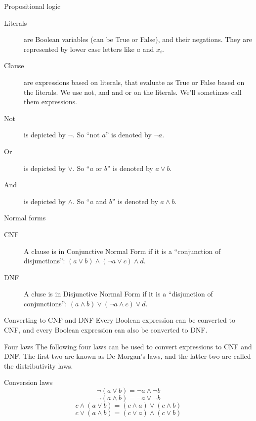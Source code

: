 \begin{frame}{Propositional logic}
  \begin{description}
    \item[Literals] are Boolean variables (can be True or False), and their negations. They are represented by lower case letters like $a$ and $x_i$.
    \vspace{0.3cm}
    \item[Clause] are expressions based on literals, that evaluate as True or False based on the literals. We use not, and and or on the literals. We'll sometimes call them expressions.
    \vspace{0.3cm}
    \item[Not] is depicted by $\neg$. So ``not $a$'' is denoted by $\neg a$.
    \vspace{0.3cm}
    \item[Or] is depicted by $\lor$. So ``$a$ or $b$'' is denoted by $a \lor b$.
    \vspace{0.3cm}
    \item[And] is depicted by $\land$. So ``$a$ and $b$'' is denoted by $a \land b$.
  \end{description}
\end{frame}


\begin{frame}{Normal forms}
  \begin{description}
    \item[CNF] A clause is in Conjunctive Normal Form if it is a ``conjunction of disjunctions'': $(a \lor b) \land (\neg a \lor c) \land d$.
    \vspace{0.5cm}
    \item[DNF] A cluse is in Disjunctive Normal Form if it is a ``disjunction of conjunctions'': $(a \land b) \lor (\neg a \land c) \lor d$.
  \end{description}
  
  \vspace{4mm}
  \begin{alertblock}{Converting to CNF and DNF}
    Every Boolean expression can be converted to CNF, and every Boolean expression can also be converted to DNF.
  \end{alertblock}
\end{frame}


\begin{frame}{Four laws}
  The following four laws can be used to convert expressions to CNF and DNF.
  The first two are known as De Morgan's laws, and the latter two are called the distributivity laws.
  \vspace{4mm}
  \begin{alertblock}{Conversion laws}
    \[ \neg ( a \lor b) = \neg a \land \neg b \]
    \[ \neg ( a \land b) = \neg a \lor \neg b \]
    \[ c \land ( a \lor b) = (c \land a) \lor (c \land b) \]
    \[ c \lor ( a \land b) = (c \lor a) \land (c \lor b) \]
  \end{alertblock}
\end{frame}


